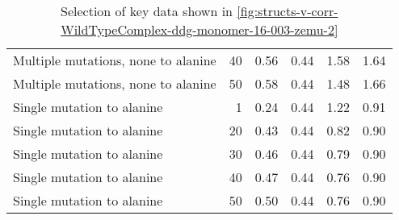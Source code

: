 \begin{table}
\begin{tabular}{lrrrrr}
 Multiple mutations, none to alanine &          40 &             0.56 &                    0.44 &               1.58 &                      1.64 \\
 Multiple mutations, none to alanine &          50 &             0.58 &                    0.44 &               1.48 &                      1.66 \\
          Single mutation to alanine &           1 &             0.24 &                    0.44 &               1.22 &                      0.91 \\
          Single mutation to alanine &          20 &             0.43 &                    0.44 &               0.82 &                      0.90 \\
          Single mutation to alanine &          30 &             0.46 &                    0.44 &               0.79 &                      0.90 \\
          Single mutation to alanine &          40 &             0.47 &                    0.44 &               0.76 &                      0.90 \\
          Single mutation to alanine &          50 &             0.50 &                    0.44 &               0.76 &                      0.90 \\
\bottomrule
\end{tabular}

\caption[]{Selection of key data shown in \cref{fig:structs-v-corr-WildTypeComplex-ddg-monomer-16-003-zemu-2}}
\label{tab:structs-v-corr-WildTypeComplex-ddg-monomer-16-003-zemu-2-underlying-data}
\end{table}
